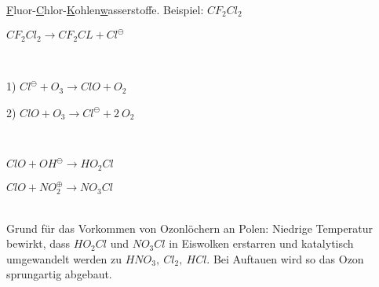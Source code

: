 \begin{definition}[FCKW]
	\underline{F}luor-\underline{C}hlor-\underline{K}ohlen\underline{w}asserstoffe. Beispiel: $CF_2Cl_2$
\end{definition}

\begin{definition}
	{\large
		$CF_2Cl_2 \rightarrow CF_2CL + Cl^\ominus$
	}
\end{definition}

\begin{definition}[Ozonabbaukreislauf]\leavevmode \\
	{\large
		1) $Cl^\ominus + O_3 \rightarrow ClO + O_2$	
		
		2) $ClO + O_3 \rightarrow Cl^\ominus + 2 \ O_2$
	}
\end{definition}

\begin{definition}\leavevmode \\
	{\large
		$ClO +  OH^\ominus \rightarrow HO_2Cl$
		
		$ClO + NO_2^\oplus \rightarrow NO_3Cl$	
	}
\end{definition}
\leavevmode \\
Grund für das Vorkommen von Ozonlöchern an Polen: Niedrige Temperatur bewirkt, dass $HO_2Cl$ und $NO_3Cl$ in Eiswolken erstarren und katalytisch umgewandelt werden zu $HNO_3,\ Cl_2,\ HCl$. Bei Auftauen wird so das Ozon sprungartig abgebaut.